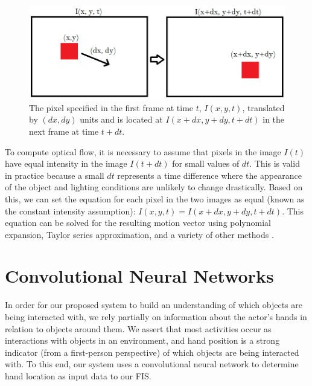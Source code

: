 \documentclass[12pt]{report}
\begin{document}
\begin{figure}
    \centering
    \includegraphics[width=\linewidth]{figure/optical_flow.png}
    \caption{The pixel specified in the first frame at time $t$, $I(x, y, t)$, translated by $(dx, dy)$ units and is located at $I(x+dx, y+dy, t+dt)$ in the next frame at time $t+dt$.}
    \label{fig:optical_flow}
\end{figure}

To compute optical flow, it is necessary to assume that pixels in the image $I(t)$ have equal intensity in the image $I(t+dt)$ for small values of $dt$. This is valid in practice because a small $dt$ represents a time difference where the appearance of the object and lighting conditions are unlikely to change drastically. Based on this, we can set the equation for each pixel in the two images as equal (known as the constant intensity assumption): $I(x, y, t)  = I(x+dx, y+dy, t+dt)$. This equation can be solved for the resulting motion vector using polynomial expansion, Taylor series approximation, and a variety of other methods \cite{Farneback2003Two-FrameOn, Horn1980DeterminingFlow, Lucas1981AnVision}.






\section{Convolutional Neural Networks}
In order for our proposed system to build an understanding of which objects are being interacted with, we rely partially on information about the actor's hands in relation to objects around them. We assert that most activities occur as interactions with objects in an environment, and hand position is a strong indicator (from a first-person perspective) of which objects are being interacted with. To this end, our system uses a convolutional neural network to determine hand location as input data to our FIS.
\end{document}

